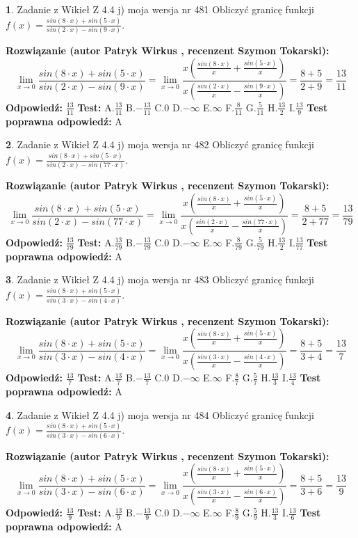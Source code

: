 \documentclass[12pt, a4paper]{article}
\theoremstyle{definition} %
\newtheorem{zad}{}
\newcommand{\zadStart}[1]{\begin{zad}#1\newline}
\newcommand{\zadStop}{\end{zad}}
\newcommand{\rozwStart}[2]{\noindent \textbf{Rozwiązanie (autor #1 , recenzent #2): }\newline}
\newcommand{\rozwStop}{\newline}
\newcommand{\odpStart}{\noindent \textbf{Odpowiedź:}\newline}
\newcommand{\odpStop}{\newline}
\newcommand{\testStart}{\noindent \textbf{Test:}\newline}
\newcommand{\testStop}{\newline}
\newcommand{\kluczStart}{\noindent \textbf{Test poprawna odpowiedź:}\newline}
\newcommand{\kluczStop}{\newline}
\begin{document}
\zadStart{Zadanie z Wikieł Z 4.4 j) moja wersja nr 481}
Obliczyć granicę funkcji $f(x)=\frac{sin(8\cdot x) +sin(5\cdot x)}{sin(2\cdot x) -sin(9\cdot x)}$.
\zadStop
\rozwStart{Patryk Wirkus}{Szymon Tokarski}
$$\lim\limits_{x\to 0}\frac{sin(8\cdot x) +sin(5\cdot x)}{sin(2\cdot x) -sin(9\cdot x)}=\lim\limits_{x\to 0}\frac{x(\frac{sin(8\cdot x)}{x}+\frac{sin(5\cdot x)}{x})}{x(\frac{sin(2\cdot x)}{x}-\frac{sin(9\cdot x)}{x})}=\frac{8+5}{2+9} = \frac{13}{11}$$
\rozwStop
\odpStart
$\frac{13}{11}$
\odpStop
\testStart
A.$\frac{13}{11}$
B.$-\frac{13}{11}$
C.$0$
D.$-\infty$
E.$\infty$
F.$\frac{8}{11}$
G.$\frac{5}{11}$
H.$\frac{13}{2}$
I.$\frac{13}{9}$
\testStop
\kluczStart
A
\kluczStop



\zadStart{Zadanie z Wikieł Z 4.4 j) moja wersja nr 482}
Obliczyć granicę funkcji $f(x)=\frac{sin(8\cdot x) +sin(5\cdot x)}{sin(2\cdot x) -sin(77\cdot x)}$.
\zadStop
\rozwStart{Patryk Wirkus}{Szymon Tokarski}
$$\lim\limits_{x\to 0}\frac{sin(8\cdot x) +sin(5\cdot x)}{sin(2\cdot x) -sin(77\cdot x)}=\lim\limits_{x\to 0}\frac{x(\frac{sin(8\cdot x)}{x}+\frac{sin(5\cdot x)}{x})}{x(\frac{sin(2\cdot x)}{x}-\frac{sin(77\cdot x)}{x})}=\frac{8+5}{2+77} = \frac{13}{79}$$
\rozwStop
\odpStart
$\frac{13}{79}$
\odpStop
\testStart
A.$\frac{13}{79}$
B.$-\frac{13}{79}$
C.$0$
D.$-\infty$
E.$\infty$
F.$\frac{8}{79}$
G.$\frac{5}{79}$
H.$\frac{13}{2}$
I.$\frac{13}{77}$
\testStop
\kluczStart
A
\kluczStop



\zadStart{Zadanie z Wikieł Z 4.4 j) moja wersja nr 483}
Obliczyć granicę funkcji $f(x)=\frac{sin(8\cdot x) +sin(5\cdot x)}{sin(3\cdot x) -sin(4\cdot x)}$.
\zadStop
\rozwStart{Patryk Wirkus}{Szymon Tokarski}
$$\lim\limits_{x\to 0}\frac{sin(8\cdot x) +sin(5\cdot x)}{sin(3\cdot x) -sin(4\cdot x)}=\lim\limits_{x\to 0}\frac{x(\frac{sin(8\cdot x)}{x}+\frac{sin(5\cdot x)}{x})}{x(\frac{sin(3\cdot x)}{x}-\frac{sin(4\cdot x)}{x})}=\frac{8+5}{3+4} = \frac{13}{7}$$
\rozwStop
\odpStart
$\frac{13}{7}$
\odpStop
\testStart
A.$\frac{13}{7}$
B.$-\frac{13}{7}$
C.$0$
D.$-\infty$
E.$\infty$
F.$\frac{8}{7}$
G.$\frac{5}{7}$
H.$\frac{13}{3}$
I.$\frac{13}{4}$
\testStop
\kluczStart
A
\kluczStop



\zadStart{Zadanie z Wikieł Z 4.4 j) moja wersja nr 484}
Obliczyć granicę funkcji $f(x)=\frac{sin(8\cdot x) +sin(5\cdot x)}{sin(3\cdot x) -sin(6\cdot x)}$.
\zadStop
\rozwStart{Patryk Wirkus}{Szymon Tokarski}
$$\lim\limits_{x\to 0}\frac{sin(8\cdot x) +sin(5\cdot x)}{sin(3\cdot x) -sin(6\cdot x)}=\lim\limits_{x\to 0}\frac{x(\frac{sin(8\cdot x)}{x}+\frac{sin(5\cdot x)}{x})}{x(\frac{sin(3\cdot x)}{x}-\frac{sin(6\cdot x)}{x})}=\frac{8+5}{3+6} = \frac{13}{9}$$
\rozwStop
\odpStart
$\frac{13}{9}$
\odpStop
\testStart
A.$\frac{13}{9}$
B.$-\frac{13}{9}$
C.$0$
D.$-\infty$
E.$\infty$
F.$\frac{8}{9}$
G.$\frac{5}{9}$
H.$\frac{13}{3}$
I.$\frac{13}{6}$
\testStop
\kluczStart
A
\kluczStop
\end{document}
